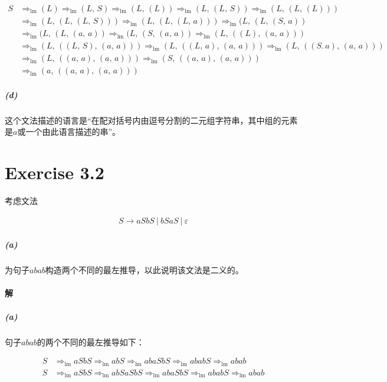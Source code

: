 \documentclass{article}
\begin{document}
\begin{align*}
    S &\Rightarrow_{\text{lm}} (L) \Rightarrow_{\text{lm}} (L,\,S) \Rightarrow_{\text{lm}} (L,\,(L)) \Rightarrow_{\text{lm}} (L,\,(L,\,S)) \Rightarrow_{\text{lm}} (L,\,(L,\,(L))) \\ &\Rightarrow_{\text{lm}} (L,\,(L,\,(L,\,S)))
    \Rightarrow_{\text{lm}} (L,\,(L,\,(L,\,a))) \Rightarrow_{\text{lm}} (L,\,(L,\,(S,\,a)) \\ &\Rightarrow_{\text{lm}} (L,\,(L,\,(a,\,a)) \Rightarrow_{\text{lm}} (L,\,(S,\,(a,\,a))
     \Rightarrow_{\text{lm}} (L,\,((L),\,(a,\,a))) \\
    &\Rightarrow_{\text{lm}} (L,\,((L,\,S),\,(a,\,a)))
    \Rightarrow_{\text{lm}} (L,\,((L,\,a),\,(a,\,a))) \Rightarrow_{\text{lm}} (L,\,((S.\,a),\,(a,\,a))) \\
    &\Rightarrow_{\text{lm}} (L,\,((a,\,a),\,(a,\,a)))
    \Rightarrow_{\text{lm}} (S,\,((a,\,a),\,(a,\,a))) \\
    &\Rightarrow_{\text{lm}} (a,\,((a,\,a),\,(a,\,a)))
\end{align*}

\subparagraph{(d)}
这个文法描述的语言是“在配对括号内由逗号分割的二元组字符串，其中组的元素是$a$或一个由此语言描述的串”。
\\

\section{Exercise 3.2}
考虑文法

\begin{align*}
    S \rightarrow aSbS\ |\ bSaS\ |\ \varepsilon
\end{align*}

\subparagraph{(a)}
为句子$abab$构造两个不同的最左推导，以此说明该文法是二义的。
\\

\paragraph{解}
\subparagraph{(a)}
句子$abab$的两个不同的最左推导如下：

\begin{align*}
    S &\Rightarrow_{\text{lm}} aSbS \Rightarrow_{\text{lm}} abS \Rightarrow_{\text{lm}} abaSbS \Rightarrow_{\text{lm}} ababS \Rightarrow_{\text{lm}} abab \\
    S &\Rightarrow_{\text{lm}} aSbS \Rightarrow_{\text{lm}} abSaSbS \Rightarrow_{\text{lm}} abaSbS \Rightarrow_{\text{lm}} ababS \Rightarrow_{\text{lm}} abab
\end{align*}
\end{document}
